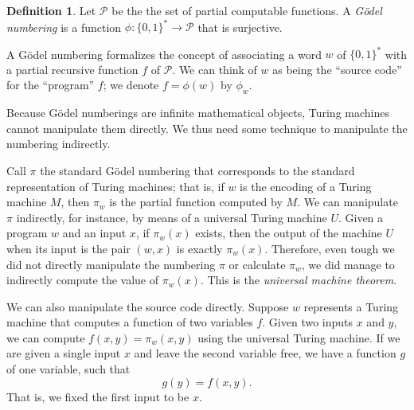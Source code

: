 \documentclass[12pt]{article}
\theoremstyle{definition}
\newtheorem{definition}{Definition}
\begin{document}
\begin{definition}
    Let $\mathcal P$ be the the set of partial computable functions.
    A \emph{Gödel numbering}
    is a function $\phi: \{0, 1\}^* \to \mathcal P$
    that is surjective.
\end{definition}

A Gödel numbering formalizes the concept of associating a word $w$ of $\{0, 1\}^*$
with a partial recursive function $f$ of $\mathcal P$.
We can think of $w$ as being the ``source code'' for the ``program'' $f$;
we denote $f = \phi(w)$ by $\phi_w$.

Because Gödel numberings are infinite mathematical objects,
Turing machines cannot manipulate them directly.
We thus need some technique to manipulate the numbering indirectly.

Call $\pi$ the standard Gödel numbering
that corresponds to the standard representation of Turing machines;
that is, if $w$ is the encoding of a Turing machine $M$,
then $\pi_w$ is the partial function computed by $M$.
We can manipulate $\pi$ indirectly, for instance,
by means of a universal Turing machine $U$.
Given a program $w$ and an input $x$,
if $\pi_w(x)$ exists,
then the output of the machine $U$ when its input is the pair $(w, x)$
is exactly $\pi_w(x)$.
Therefore,
even tough we did not directly manipulate the numbering $\pi$
or calculate $\pi_w$,
we did manage to indirectly compute the value of $\pi_w(x)$.
This is the \emph{universal machine theorem}.

We can also manipulate the source code directly.
Suppose $w$ represents a Turing machine that computes a function of two variables $f$.
Given two inputs $x$ and $y$, we can compute $f(x, y) = \pi_w(x, y)$
using the universal Turing machine.
If we are given a single input $x$ and leave the second variable free,
we have a function $g$ of one variable, such that
\begin{equation*}
    g(y) = f(x, y).
\end{equation*}
That is, we fixed the first input to be $x$.
\end{document}
